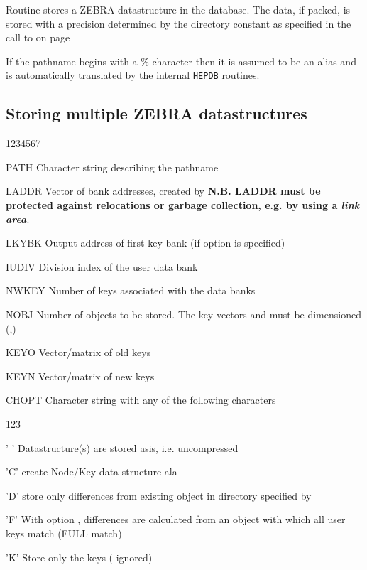 Routine  stores a ZEBRA datastructure in the database.
The data, if packed, is stored with a precision determined by the directory
constant  as specified in the call
to  on page~\pageref{CDMDIR}

If the pathname begins with a \% character then it is assumed to be
an alias and is automatically translated by the internal {\tt HEPDB}
routines.

\subsection{Storing multiple ZEBRA datastructures}


\begin{DLtt}{1234567}
\item[PATH]Character string describing the pathname
\item[LADDR]Vector of  bank addresses, created by 
  {\bf N.B. LADDR must be protected against relocations or garbage
collection, e.g. by using a {\it link area}}.
\item[LKYBK]Output address of first key bank (if option  is specified)
\item[IUDIV]Division index of the user data bank
\item[NWKEY]Number of keys associated with the data banks
\item[NOBJ]Number of objects to be stored. The key vectors
 and  must be dimensioned (,)
\item[KEYO]Vector/matrix of old keys
\item[KEYN]Vector/matrix of new keys
\item[CHOPT]Character string with any of the following characters
  \begin{DLtt}{123}
    \item[' ']Datastructure(s) are stored asis, i.e. uncompressed
    \item['C']create Node/Key data structure ala 
    \item['D']store only differences from existing object in directory
      specified by 
    \item['F']With option , differences are calculated from an
      object with which all user keys match (FULL match)
    \item['K']Store only the keys ( ignored)

\end{DLtt}
\end{DLtt}
